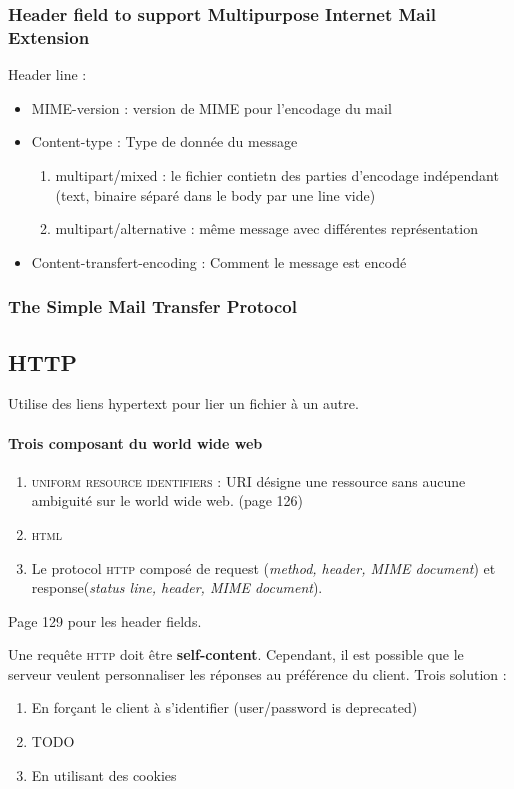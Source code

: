 \subsubsection{Header field to support Multipurpose Internet Mail Extension}
Header line :
\begin{itemize}
    \item MIME-version : version de MIME pour l'encodage du mail
    \item Content-type : Type de donnée du message
        \begin{enumerate}
            \item multipart/mixed : le fichier contietn des parties d'encodage
                indépendant (text, binaire séparé dans le body par une line vide)
            \item multipart/alternative : même message avec différentes représentation
        \end{enumerate}
    \item Content-transfert-encoding : Comment le message est encodé
\end{itemize}

\subsubsection{The Simple Mail Transfer Protocol}

\subsection{HTTP}
Utilise des liens hypertext pour lier un fichier à un autre.

\paragraph{Trois composant du world wide web}
\begin{enumerate}
    \item \textsc{uniform resource identifiers} : URI désigne une ressource sans aucune ambiguité
sur le world wide web. (page 126)
    \item \textsc{html}
    \item Le protocol \textsc{http} composé de request (\textit{method, header, MIME document}) et response(\textit{status line, header, MIME document}).
\end{enumerate}

Page 129 pour les header fields.


Une requête \textsc{http} doit être \textbf{self-content}. Cependant, il est possible que
le serveur veulent personnaliser les réponses au préférence du client. Trois solution :
\begin{enumerate}
    \item En forçant le client à s'identifier (user/password is deprecated)
    \item TODO
    \item En utilisant des cookies
\end{enumerate}

